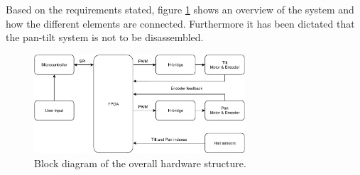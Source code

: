 \documentclass[../../main.tex]{subfiles}
\begin{document}
Based on the requirements stated, figure \ref{fig:SystemOverviewIntroduction} shows an overview of the system and how the different elements are connected. Furthermore it has been dictated that the pan-tilt system is not to be disassembled.  










\begin{figure}[H]
    \centering
    \includegraphics[width=0.7\textwidth]{Sections/Miscellaneous/Images/System_overview.pdf}
    \caption{Block diagram of the overall hardware structure.}
    \label{fig:SystemOverviewIntroduction}
\end{figure}
\end{document}
